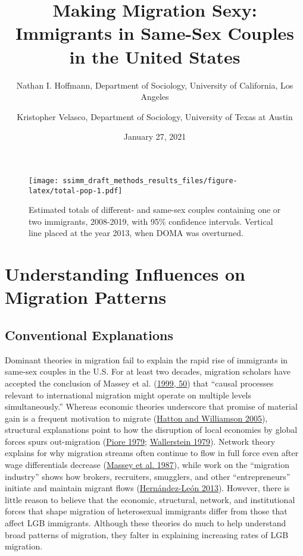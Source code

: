\documentclass[
  11pt,
]{article}
\title{Making Migration Sexy: Immigrants in Same-Sex Couples in the United States}
\author{Nathan I. Hoffmann, Department of Sociology, University of California, Los Angeles \and Kristopher Velasco, Department of Sociology, University of Texas at Austin}
\date{January 27, 2021}
\begin{document}
\maketitle

\begin{figure}
\centering
\texttt{[image: ssimm\_draft\_methods\_results\_files/figure-latex/total-pop-1.pdf]}
\caption{\label{fig:total-pop}Estimated totals of different- and same-sex couples containing one or two immigrants, 2008-2019, with 95\% confidence intervals. Vertical line placed at the year 2013, when DOMA was overturned.}
\end{figure}

\hypertarget{understanding-influences-on-migration-patterns}{%
\section{Understanding Influences on Migration Patterns}\label{understanding-influences-on-migration-patterns}}

\hypertarget{conventional-explanations}{%
\subsection{Conventional Explanations}\label{conventional-explanations}}

Dominant theories in migration fail to explain the rapid rise of immigrants in same-sex couples in the U.S. For at least two decades, migration scholars have accepted the conclusion of Massey et al. (\protect\hyperlink{ref-massey_1999}{1999, 50}) that ``causal processes relevant to international migration might operate on multiple levels simultaneously.'' Whereas economic theories underscore that promise of material gain is a frequent motivation to migrate (\protect\hyperlink{ref-hatton_2005a}{Hatton and Williamson 2005}), structural explanations point to how the disruption of local economies by global forces spurs out-migration (\protect\hyperlink{ref-piore_1979}{Piore 1979}; \protect\hyperlink{ref-wallerstein_1979}{Wallerstein 1979}). Network theory explains for why migration streams often continue to flow in full force even after wage differentials decrease (\protect\hyperlink{ref-massey_1987}{Massey et al. 1987}), while work on the ``migration industry'' shows how brokers, recruiters, smugglers, and other ``entrepreneurs'' initiate and maintain migrant flows (\protect\hyperlink{ref-hernandez-leon_2013}{Hernández-León 2013}). However, there is little reason to believe that the economic, structural, network, and institutional forces that shape migration of heterosexual immigrants differ from those that affect LGB immigrants. Although these theories do much to help understand broad patterns of migration, they falter in explaining increasing rates of LGB migration.
\end{document}
